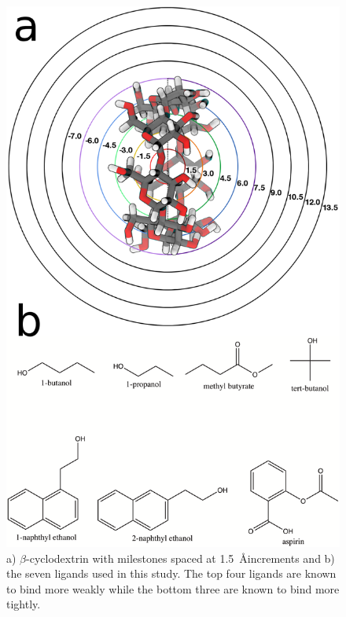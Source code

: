 \begin{figure}
    \includegraphics{images/bcdmilestones_comb_resize2.png}

	\caption{a) $\beta$-cyclodextrin with milestones spaced at 1.5~\AA increments and b) the seven ligands used in this study. The top four ligands are known to bind more weakly while the bottom three are known to bind more tightly.}
	\label{fig:BCD_ligands}
\end{figure}

